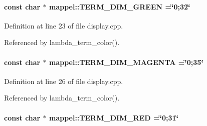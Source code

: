\paragraph[{\texorpdfstring{T\+E\+R\+M\+\_\+\+D\+I\+M\+\_\+\+G\+R\+E\+EN}{TERM_DIM_GREEN}}]{\setlength{\rightskip}{0pt plus 5cm}const char $\ast$ mappel\+::\+T\+E\+R\+M\+\_\+\+D\+I\+M\+\_\+\+G\+R\+E\+EN =\char`\"{}0;32\char`\"{}}\hypertarget{namespacemappel_af35fa592f92c75d4190e1b5aff9fbcfe}{}\label{namespacemappel_af35fa592f92c75d4190e1b5aff9fbcfe}


Definition at line 23 of file display.\+cpp.



Referenced by lambda\+\_\+term\+\_\+color().

\paragraph[{\texorpdfstring{T\+E\+R\+M\+\_\+\+D\+I\+M\+\_\+\+M\+A\+G\+E\+N\+TA}{TERM_DIM_MAGENTA}}]{\setlength{\rightskip}{0pt plus 5cm}const char $\ast$ mappel\+::\+T\+E\+R\+M\+\_\+\+D\+I\+M\+\_\+\+M\+A\+G\+E\+N\+TA =\char`\"{}0;35\char`\"{}}\hypertarget{namespacemappel_add36264e8025d4db88e03897ecda89b5}{}\label{namespacemappel_add36264e8025d4db88e03897ecda89b5}


Definition at line 26 of file display.\+cpp.



Referenced by lambda\+\_\+term\+\_\+color().

\paragraph[{\texorpdfstring{T\+E\+R\+M\+\_\+\+D\+I\+M\+\_\+\+R\+ED}{TERM_DIM_RED}}]{\setlength{\rightskip}{0pt plus 5cm}const char $\ast$ mappel\+::\+T\+E\+R\+M\+\_\+\+D\+I\+M\+\_\+\+R\+ED =\char`\"{}0;31\char`\"{}}\hypertarget{namespacemappel_ad0396f6c4c69571a8d774588bfd6a1bd}{}\label{namespacemappel_ad0396f6c4c69571a8d774588bfd6a1bd}



